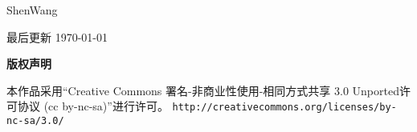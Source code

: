 \thispagestyle{plain}
\begin{center}
  {\LARGE\textbf{\BookTitle}}

  \vspace{1em}
  {\large ShenWang}

  \vspace{1ex}
  
  \vspace{1ex}
  最后更新 \today
  
  \vspace{1em}
  \textbf{\large 版权声明}
\end{center}
\noindent 本作品采用“Creative Commons 署名-非商业性使用-相同方式共享 3.0 Unported许可协议 
(cc by-nc-sa)”进行许可。
\texttt{\small http://creativecommons.org/licenses/by-nc-sa/3.0/}

\vspace{1em}
